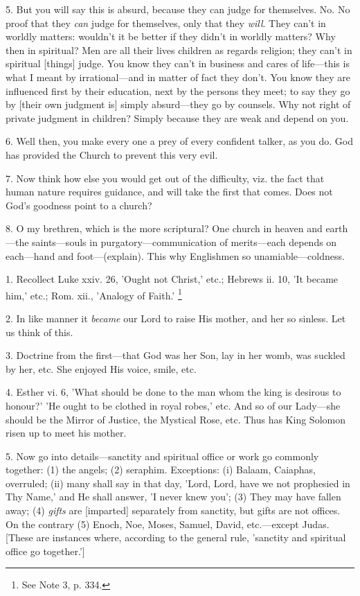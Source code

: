 5. But you will say this is absurd, because they
can judge for themselves. No. No proof that they \emph{can} judge for
themselves, only that they \emph{will}. They can't in worldly matters:
wouldn't it be better if they didn't in worldly matters? Why then in
spiritual? Men are all their lives children as regards religion; they
can't in spiritual [things] judge. You know they can't in business and
cares of life—this is what I meant by irrational—and in matter of
fact they don't. You know they are influenced first by their
education, next by the persons they meet; to say they go by [their own
judgment is] simply absurd—they go by counsels. Why not right of
private judgment in children? Simply because they are weak and depend
on you.

6. Well then, you make every one a prey of every
confident talker, as you do. God has provided the Church to prevent
this very evil.

7. Now think how else you would get out of the
difficulty, viz. the fact that human nature requires guidance, and
will take the first that comes. Does not God's goodness point to a
church?

8. O my brethren, which is the more scriptural?
One church in heaven and earth—the saints—souls in
purgatory—communication of merits—each depends on each—hand and
foot—(explain). This why Englishmen so unamiable—coldness.


1. Recollect Luke xxiv. 26, 'Ought not Christ,'
etc.; Hebrews ii. 10, 'It became him,' etc.; Rom. xii., 'Analogy of
Faith.' \footnote{See Note
3, p. 334.}

2. In like manner it \emph{became} our Lord to
raise His mother, and her so sinless. Let us think of this.

3. Doctrine from the first—that God was her
Son, lay in her womb, was suckled by her, etc. She enjoyed His voice,
smile, etc.

4. Esther vi. 6, 'What should be done to the man
whom the king is desirous to honour?' 'He ought to be clothed in royal
robes,' etc. And so of our Lady—she should be the Mirror of Justice,
the Mystical Rose, etc. Thus has King Solomon risen up to meet his
mother.

5. Now go into details—sanctity and spiritual
office or work go commonly together: (1) the angels; (2) seraphim.
Exceptions: (i) Balaam, Caiaphas, overruled; (ii) many shall say in
that day, 'Lord, Lord, have we not prophesied in Thy Name,' and He
shall answer, 'I never knew you'; (3) They may have fallen away; (4) \emph{gifts}
are [imparted] separately from sanctity, but gifts are not offices. On
the contrary (5) Enoch, Noe, Moses, Samuel, David, etc.—except
Judas. [These are instances where, according to the general rule,
'sanctity and spiritual office go together.']

